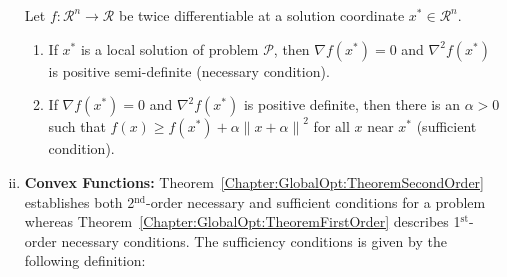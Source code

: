 \begin{enumerate}[i)]
\begin{thm}\label{Chapter:GlobalOpt:TheoremSecondOrder}
Let $f:\mathcal{R}^{n}\rightarrow\mathcal{R}$ be twice differentiable at a solution coordinate $x^{\ast}\in\mathcal{R}^{n}$. 
   \begin{enumerate}
       \item If $x^{\ast}$ is a local solution of problem $\mathcal{P}$, then $\nabla f\left(x^{\ast}\right)=0$ and $\nabla^{2}f\left(x^{\ast}\right)$ is positive semi-definite (necessary condition).
       \item If $\nabla f\left(x^{\ast}\right)=0$ and $\nabla^{2}f\left(x^{\ast}\right)$ is positive definite, then there is an $\alpha > 0$ such that $f\left(x\right)\ge f\left(x^{\ast}\right)+\alpha\left\|x+\alpha\right\|^{2}$ for all $x$ near $x^{\ast}$ (sufficient condition).
   \end{enumerate}
\end{thm}

\item {\bf Convex Functions:} Theorem~\ref{Chapter:GlobalOpt:TheoremSecondOrder} establishes both 2$^{\text{nd}}$-order necessary and sufficient conditions for a problem whereas Theorem~\ref{Chapter:GlobalOpt:TheoremFirstOrder} describes 1$^{\text{st}}$-order necessary conditions. The sufficiency conditions is given by the following definition:


\end{enumerate}

